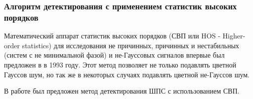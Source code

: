 \subsubsection{Алгоритм детектирования с применением статистик высоких порядков}
\label{sbs:sec1_hos}

Математический аппарат статистик высоких порядков (СВП или HOS - Higher-order statistics)
для исследования не причинных, причинных и нестабильных
(систем с не минимальной фазой) и не-Гауссовых сигналов впервые был предложен в \cite{hos_petropulu} в 1993 году.
Этот метод позволяет не только подавлять цветной Гауссов шум, но так же в некоторых случаях подавлять
цветной не-Гауссов шум.

В работе \cite{hos_zhao} был предложен метод детектирования ШПС с использованием СВП.

\newpage
